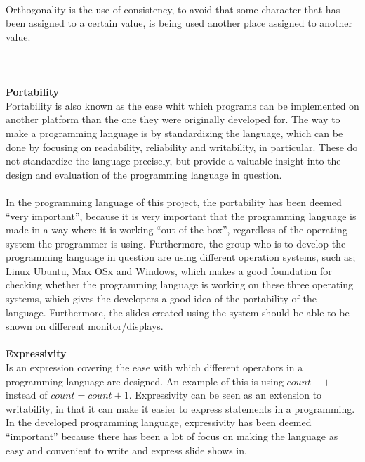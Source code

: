  \\
Orthogonality is the use of consistency, to avoid that some character that has been assigned to a certain value, is being used another place assigned to another value.
\\ \\
\\ \\
\textbf{Portability} \\
Portability is also known as the ease whit which programs can be implemented on another platform than the one they were originally developed for. The way to make a programming language is by standardizing the language, which can be done by focusing on readability, reliability and writability, in particular. These do not standardize the language precisely, but provide a valuable insight into the design and evaluation of the programming language in question.
\\ \\
In the programming language of this project, the portability has been deemed ``very important'', because it is very important that the programming language is made in a way where it is working ``out of the box'', regardless of the operating system the programmer is using. Furthermore, the group who is to develop the programming language in question are using different operation systems, such as; Linux Ubuntu, Max OSx and Windows, which makes a good foundation for checking whether the programming language is working on these three operating systems, which gives the developers a good idea of the portability of the language. Furthermore, the slides created using the system should be able to be shown on different monitor/displays.
\\ \\
\textbf{Expressivity} \\
Is an expression covering the ease with which different operators in a programming language are designed. An example of this is using $count++$ instead of $count = count + 1$. Expressivity can
be seen as an extension to writability, in that it can make it easier to express statements in a programming. In the developed programming language, expressivity has been deemed ``important'' because there has been a lot of focus on making the language as easy and convenient to write and express slide shows in.
\\ \\
